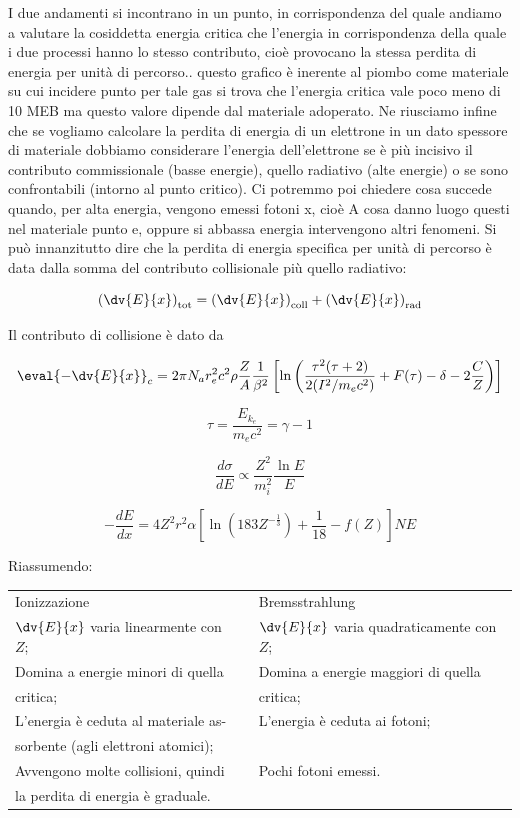 I due andamenti si incontrano in un punto, in corrispondenza del quale andiamo a valutare la cosiddetta energia critica che l'energia in corrispondenza della quale i due processi hanno lo stesso contributo, cioè provocano la stessa perdita di energia per unità di percorso.. questo grafico è inerente al piombo come materiale su cui incidere punto per tale gas si trova che l'energia critica vale poco meno di 10 MEB ma questo valore dipende dal materiale adoperato. Ne riusciamo infine che se vogliamo calcolare la perdita di energia di un elettrone in un dato spessore di materiale dobbiamo considerare l'energia dell'elettrone se è più incisivo il contributo commissionale (basse energie), quello radiativo (alte energie) o se sono confrontabili (intorno al punto critico). Ci potremmo poi chiedere cosa succede quando, per alta energia, vengono emessi fotoni x, cioè A cosa danno luogo questi nel materiale punto e, oppure si abbassa energia intervengono altri fenomeni. Si può innanzitutto dire che la perdita di energia specifica per unità di percorso è data dalla somma del contributo collisionale più quello radiativo:

$$\left(\dv{E}{x}\right)_{\rm tot}
=\left(\dv{E}{x}\right)_{\rm coll} + \left(\dv{E}{x}\right)_{\rm rad}$$

Il contributo di collisione è dato da

$$\eval{-\dv{E}{x}}_{c}
=2 \pi N_a r_e^2 c^2 \rho \frac{Z}{A} \frac{1}{\beta^2} \left[\ln{\left(\frac{\tau^2 (\tau + 2)}{2(I^2/m_e c^2)} + F(\tau) - \delta - 2 \frac{C}{Z}\right)}\right]$$

$$\tau=\frac{E_{k_e}}{m_e c^2}=\gamma - 1$$

$$\frac{d \sigma}{d E} \propto \frac{Z^2}{m_i^2} \frac{\ln{E}}{E}$$

$$-\frac{d E}{d x}
=4 Z^2 r^2 \alpha \left[\ln{(183Z^{-\frac{1}{3}})} + \frac{1}{18} - f(Z)\right]NE$$

Riassumendo:

\begin{center}
    \begin{tabular}{p{6.7cm}p{0.8cm}p{6.7cm}}
        \hspace{2cm}Ionizzazione & & \hspace{2cm}Bremsstrahlung\\[0.5cm]
        $\displaystyle \dv{E}{x}$ varia linearmente con $Z$\footnotemark; & & $\displaystyle \dv{E}{x}$ varia quadraticamente con $Z$;\\[0.5cm]
        Domina a energie minori di quella & & Domina a energie maggiori di quella\\
        critica; & & critica;\\[0.2cm]
        L'energia è ceduta al materiale as- & & L'energia è ceduta ai fotoni;\\
        sorbente (agli elettroni atomici); & &\\[0.2cm]
        Avvengono molte collisioni, quindi & & Pochi fotoni emessi.\\
        la perdita di energia è graduale. & &
    \end{tabular}
\end{center}

